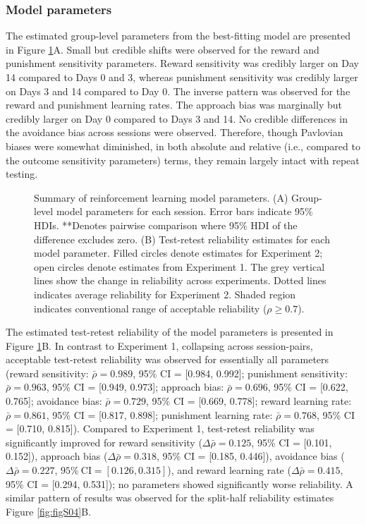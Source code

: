 \documentclass[a4paper,12pt]{article}
\begin{document}
\begin{refsection}[main]
\subsubsection*{Model parameters}

The estimated group-level parameters from the best-fitting model are presented in Figure \ref{fig:exp02_modeling}A. Small but credible shifts were observed for the reward and punishment sensitivity parameters. Reward sensitivity was credibly larger on Day 14 compared to Days 0 and 3, whereas punishment sensitivity was credibly larger on Days 3 and 14 compared to Day 0. The inverse pattern was observed for the reward and punishment learning rates. The approach bias was marginally but credibly larger on Day 0 compared to Days 3 and 14. No credible differences in the avoidance bias across sessions were observed. Therefore, though Pavlovian biases were somewhat diminished, in both absolute and relative (i.e., compared to the outcome sensitivity parameters) terms, they remain largely intact with repeat testing.   

\begin{figure}[b!]
    \centerline{}
    \caption{Summary of reinforcement learning model parameters. (A) Group-level model parameters for each session. Error bars indicate 95\% HDIs. **Denotes pairwise comparison where 95\% HDI of the difference excludes zero. (B) Test-retest reliability estimates for each model parameter. Filled circles denote estimates for Experiment 2; open circles denote estimates from Experiment 1. The grey vertical lines show the change in reliability across experiments. Dotted lines indicates average reliability for Experiment 2. Shaded region indicates conventional range of acceptable reliability ($\rho \geq 0.7$).}
    \label{fig:exp02_modeling}
\end{figure}

The estimated test-retest reliability of the model parameters is presented in Figure \ref{fig:exp02_modeling}B. In contrast to Experiment 1, collapsing across session-pairs, acceptable test-retest reliability was observed for essentially all parameters (reward sensitivity: $\bar{\rho} = 0.989$, 95\% CI = [0.984, 0.992]; punishment sensitivity: $\bar{\rho} = 0.963$, 95\% CI = [0.949, 0.973]; approach bias: $\bar{\rho} = 0.696$, 95\% CI = [0.622, 0.765]; avoidance bias: $\bar{\rho} = 0.729$, 95\% CI = [0.669, 0.778]; reward learning rate: $\bar{\rho} = 0.861$, 95\% CI = [0.817, 0.898]; punishment learning rate: $\bar{\rho} = 0.768$, 95\% CI = [0.710, 0.815]). Compared to Experiment 1, test-retest reliability was significantly improved for reward sensitivity ($\Delta\bar{\rho} = 0.125$, 95\% CI = [0.101, 0.152]), approach bias ($\Delta\bar{\rho} = 0.318$, 95\% CI = [0.185, 0.446]), avoidance bias ($\Delta\bar{\rho} = 0.227$, $95\% \ \text{CI} = [0.126, 0.315]$), and reward learning rate ($\Delta\bar{\rho} = 0.415$, 95\% CI = [0.294, 0.531]); no parameters showed significantly worse reliability. A similar pattern of results was observed for the split-half reliability estimates Figure \ref{fig:figS04}B.


\end{refsection}
\end{document}
